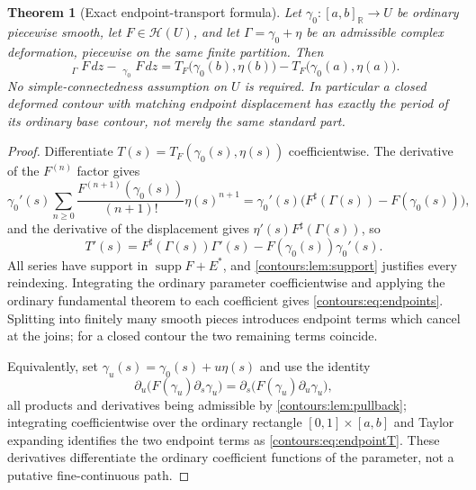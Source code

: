 \documentclass[11pt,letterpaper]{article}
\newtheorem{theorem}{Theorem}[section]
\theoremstyle{definition}
\theoremstyle{remark}
\newcommand{\R}{\mathbb R}\newcommand{\C}{\mathbb C}\newcommand{\Q}{\mathbb Q}
\newcommand{\HH}{\mathcal H}\newcommand{\A}{\mathscr A}\newcommand{\OO}{\mathcal O}
\newcommand{\supp}{\operatorname{supp}}\newcommand{\Res}{\operatorname{Res}}
\newcommand{\HInt}{\mathop{\int^{\!H}}\nolimits}
\newcommand{\sh}{^{\sharp}}\newcommand{\dd}{\,d}
\numberwithin{equation}{section}
\begin{document}
\begin{theorem}[Exact endpoint-transport formula]\label{contours:thm:endpoints}
Let $\gamma_0:[a,b]_\R\to U$ be ordinary piecewise smooth, let $F\in\HH(U)$, and let
$\Gamma=\gamma_0+\eta$ be an admissible complex deformation, piecewise on the same
finite partition. Then
\begin{equation}\label{contours:eq:endpoints}
 \boxed{\quad
 \HInt_\Gamma F\dd z-\HInt_{\gamma_0}F\dd z
 =T_F\bigl(\gamma_0(b),\eta(b)\bigr)-T_F\bigl(\gamma_0(a),\eta(a)\bigr).
 \quad}
\end{equation}
\emph{No simple-connectedness assumption on $U$ is required.} In particular a closed
deformed contour with matching endpoint displacement has exactly the period of its
ordinary base contour, not merely the same standard part.
\end{theorem}
\begin{proof}
Differentiate $T(s)=T_F(\gamma_0(s),\eta(s))$ coefficientwise. The derivative of the
$F^{(n)}$ factor gives
\[
  \gamma_0'(s)\sum_{n\ge0}\frac{F^{(n+1)}(\gamma_0(s))}{(n+1)!}\eta(s)^{n+1}
  =\gamma_0'(s)\bigl(F\sh(\Gamma(s))-F(\gamma_0(s))\bigr),
\]
and the derivative of the displacement gives $\eta'(s)F\sh(\Gamma(s))$, so
\[
  T'(s)=F\sh(\Gamma(s))\Gamma'(s)-F(\gamma_0(s))\gamma_0'(s).
\]
All series have support in $\supp F+E^*$, and \cref{contours:lem:support} justifies
every reindexing. Integrating the ordinary parameter coefficientwise and applying
the ordinary fundamental theorem to each coefficient gives
\eqref{contours:eq:endpoints}. Splitting into finitely many smooth pieces introduces
endpoint terms which cancel at the joins; for a closed contour the two remaining
terms coincide.

Equivalently, set $\gamma_u(s)=\gamma_0(s)+u\eta(s)$ and use the identity
\begin{equation}\label{contours:eq:variation}
  \partial_u\bigl(F(\gamma_u)\partial_s\gamma_u\bigr)
  =\partial_s\bigl(F(\gamma_u)\partial_u\gamma_u\bigr),
\end{equation}
all products and derivatives being admissible by \cref{contours:lem:pullback};
integrating coefficientwise over the ordinary rectangle $[0,1]\times[a,b]$ and
Taylor expanding identifies the two endpoint terms as
\eqref{contours:eq:endpointT}. These derivatives differentiate the ordinary
coefficient functions of the parameter, not a putative fine-continuous path.
\end{proof}
\end{document}
